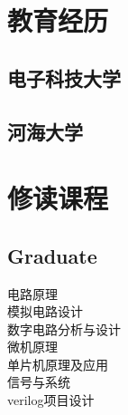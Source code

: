 \documentclass[]{deedy-resume-openfont}
\begin{document}
\begin{minipage}[t]{0.25\textwidth} 


\section{教育经历} 
\sectionsep

\subsection{电子科技大学}
\sectionsep

\subsection{河海大学}
\sectionsep




\section{修读课程}
\subsection{Graduate}
电路原理 \\
模拟电路设计 \\
数字电路分析与设计 \\
微机原理 \\
单片机原理及应用 \\
信号与系统 \\
verilog项目设计 \\
\sectionsep


\end{minipage}
\end{document}
